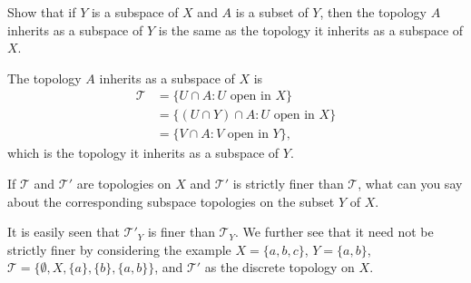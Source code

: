 \begin{exercise}
	Show that if $Y$ is a subspace of $X$ and $A$ is a subset of $Y$, then the topology $A$ inherits as a subspace of $Y$ is the same as the topology it inherits as a subspace of $X$.
\end{exercise}
\begin{solution*}	
	The topology $A$ inherits as a subspace of $X$ is
	\begin{align*}
		\mathcal{T} &= \{ U\cap A : U\text{ open in }X \} \\
			&= \{ (U\cap Y) \cap A : U\text{ open in }X \} \\
			&= \{ V\cap A : V\text{ open in }Y \},
	\end{align*}
	which is the topology it inherits as a subspace of $Y$.
\end{solution*}

\begin{exercise}
	If $\mathcal{T}$ and $\mathcal{T}'$ are topologies on $X$ and $\mathcal{T}'$ is strictly finer than $\mathcal{T}$, what can you say about the corresponding subspace topologies on the subset $Y$ of $X$.
\end{exercise}
\begin{solution*}
	It is easily seen that $\mathcal{T}'_Y$ is finer than $\mathcal{T}_Y$. We further see that it need not be strictly finer by considering the example $X=\{a,b,c\}$, $Y=\{a,b\}$, $\mathcal{T}=\{\emptyset,X,\{a\},\{b\},\{a,b\}\}$, and $\mathcal{T}'$ as the discrete topology on $X$.
\end{solution*}

